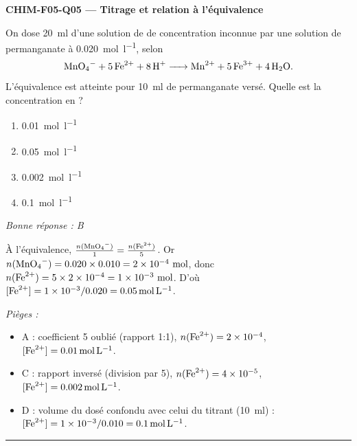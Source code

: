 \documentclass[11pt,a4paper]{article}
\begin{document}
\noindent\textbf{CHIM-F05-Q05 --- Titrage et relation à l'équivalence}\par
On dose \qty{20}{\milli\litre} d'une solution de  de concentration inconnue par une solution de permanganate à \qty{0.020}{\mole\per\litre}, selon
\[\ce{MnO4^- + 5 Fe^2+ + 8 H^+ -> Mn^2+ + 5 Fe^3+ + 4 H2O}.\]
L'équivalence est atteinte pour \qty{10}{\milli\litre} de permanganate versé. Quelle est la concentration en  ?
\begin{enumerate}[label=\Alph*)]
\item \qty{0.01}{\mole\per\litre}
\item \qty{0.05}{\mole\per\litre}
\item \qty{0.002}{\mole\per\litre}
\item \qty{0.1}{\mole\per\litre}
\end{enumerate}
\textit{Bonne réponse : B}\par
À l'équivalence, $\tfrac{n(\ce{MnO4^-})}{1}=\tfrac{n(\ce{Fe^2+})}{5}$. Or $n(\ce{MnO4^-})=\num{0.020}\times\num{0.010}=\num{2e-4}~\si{\mole}$, donc $n(\ce{Fe^2+})=\num{5}\times\num{2e-4}=\num{1e-3}~\si{\mole}$. D'où $[\ce{Fe^2+}]=\num{1e-3}/\num{0.020}=\qty{0.05}{\mole\per\litre}$.\par
\textit{Pièges :}
\begin{itemize}
\item A : coefficient \num{5} oublié (rapport \num{1}:\num{1}), $n(\ce{Fe^2+})=\num{2e-4}$, $[\ce{Fe^2+}]=\qty{0.01}{\mole\per\litre}$.
\item C : rapport inversé (division par \num{5}), $n(\ce{Fe^2+})=\num{4e-5}$, $[\ce{Fe^2+}]=\qty{0.002}{\mole\per\litre}$.
\item D : volume du dosé confondu avec celui du titrant (\qty{10}{\milli\litre}) : $[\ce{Fe^2+}]=\num{1e-3}/\num{0.010}=\qty{0.1}{\mole\per\litre}$.
\end{itemize}
\vspace{6pt}\hrule\vspace{8pt}
\end{document}

